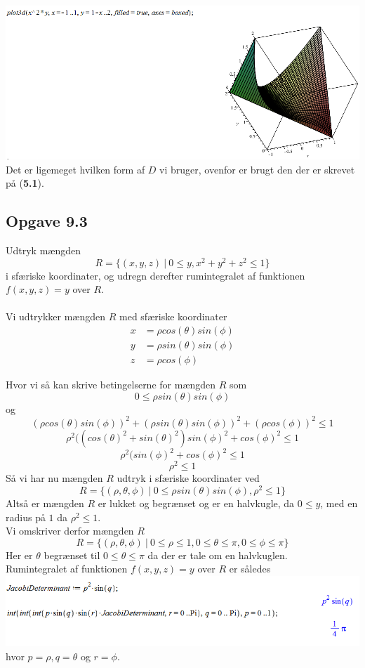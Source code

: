 \documentclass[12pt]{article}
\begin{document}
\includegraphics[scale=0.6]{Pic4}\\
Det er ligemeget hvilken form af $D$ vi bruger, ovenfor er brugt den der er skrevet på (\textbf{5.1}).

\newpage
\subsection*{Opgave 9.3}
Udtryk mængden
$$R=\{(x,y,z)\:|\: 0\leq y, x^2+y^2+z^2\leq 1\}$$
i sfæriske koordinater, og udregn derefter rumintegralet af funktionen $f(x,y,z)=y$ over $R$.\\
\\
Vi udtrykker mængden $R$ med sfæriske koordinater
\begin{align*}
x&=\rho cos(\theta)sin(\phi)\\
y&=\rho sin(\theta)sin(\phi)\\
z&=\rho cos(\phi)
\end{align*}

Hvor vi så kan skrive betingelserne for mængden $R$ som
$$0\leq \rho sin(\theta)sin(\phi)$$
og
$$(\rho cos(\theta)sin(\phi))^2+(\rho sin(\theta)sin(\phi))^2+(\rho cos(\phi))^2\leq1$$
$$\rho^2((cos(\theta)^2+sin(\theta)^2)sin(\phi)^2+cos(\phi)^2\leq1$$
$$\rho^2(sin(\phi)^2+cos(\phi)^2\leq1$$
$$\rho^2\leq1$$
Så vi har nu mængden $R$ udtryk i sfæriske koordinater ved
$$R=\{(\rho,\theta,\phi)\:|\: 0\leq \rho sin(\theta)sin(\phi),\rho^2\leq 1\}$$
Altså er mængden $R$ er lukket og begrænset og er en halvkugle, da $0\leq y$, med en radius på $1$ da $\rho^2\leq1$.\\
Vi omskriver derfor mængden $R$
$$R=\{(\rho,\theta,\phi)\:|\: 0\leq\rho\leq 1,0\leq\theta\leq \pi, 0\leq\phi\leq\pi\}$$
Her er $\theta$ begrænset til $0\leq\theta\leq\pi$ da der er tale om en halvkuglen.\\
Rumintegralet af funktionen $f(x,y,z)=y$ over $R$ er således\\
\includegraphics[scale=0.6]{Pic5}\\
hvor $p=\rho,q=\theta$ og $r=\phi$.
\end{document}
